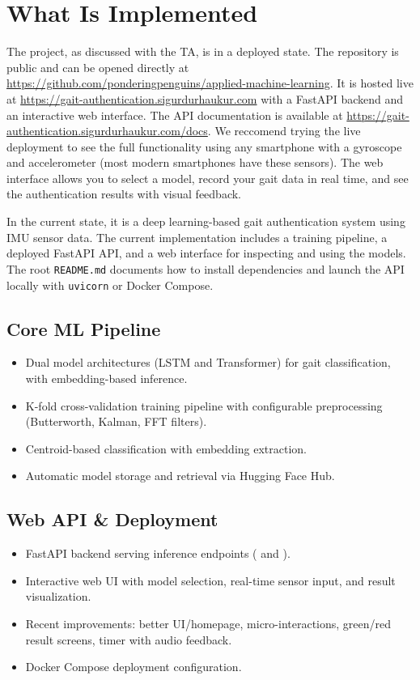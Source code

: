 \section{What Is Implemented}

The project, as discussed with the TA, is in a deployed state. The repository is public and can be opened directly at \url{https://github.com/ponderingpenguins/applied-machine-learning}. It is hosted live at \url{https://gait-authentication.sigurdurhaukur.com} with a FastAPI backend and an interactive web interface. The API documentation is available at \url{https://gait-authentication.sigurdurhaukur.com/docs}. We reccomend trying the live deployment to see the full functionality using any smartphone with a gyroscope and accelerometer (most modern smartphones have these sensors). The web interface allows you to select a model, record your gait data in real time, and see the authentication results with visual feedback.

In the current state, it is a deep learning-based gait authentication system using IMU sensor data. The current implementation includes a training pipeline, a deployed FastAPI API, and a web interface for inspecting and using the models. The root \texttt{README.md} documents how to install dependencies and launch the API locally with \texttt{uvicorn} or Docker Compose.

\subsection*{Core ML Pipeline}
\begin{itemize}
    \item Dual model architectures (LSTM and Transformer) for gait classification, with embedding-based inference.
    \item K-fold cross-validation training pipeline with configurable preprocessing (Butterworth, Kalman, FFT filters).
    \item Centroid-based classification with embedding extraction.
    \item Automatic model storage and retrieval via Hugging Face Hub.
\end{itemize}

\subsection*{Web API \& Deployment}
\begin{itemize}
    \item FastAPI backend serving inference endpoints (\texttt{} and \texttt{}).
    \item Interactive web UI with model selection, real-time sensor input, and result visualization.
    \item Recent improvements: better UI/homepage, micro-interactions, green/red result screens, timer with audio feedback.
    \item Docker Compose deployment configuration.
\end{itemize}

